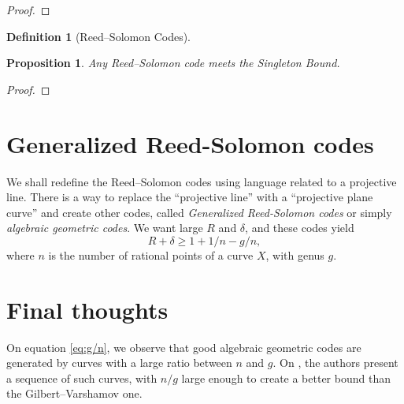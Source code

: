 \documentclass[11pt, letterpaper]{amsart}
\newtheorem{prop}[thm]{Proposition}
\theoremstyle{definition}
\newtheorem{defn}[]{Definition}
\begin{document}
\begin{proof}

\end{proof}

\begin{defn}[Reed--Solomon Codes]

\end{defn}
\begin{prop}
Any Reed--Solomon code meets the Singleton Bound.
\end{prop}
\begin{proof}

\end{proof}

\section{Generalized Reed-Solomon codes} \label{s:grs}
We shall redefine the Reed--Solomon codes using language related to a projective line. There is a way to replace the ``projective line'' with a ``projective plane curve'' and create other codes, called \emph{Generalized Reed-Solomon codes} or simply \emph{algebraic geometric codes}. We want large $R$ and $\delta$, and these codes yield \begin{equation}\label{eq:g/n} R + \delta \ge 1 + 1/n - g/n,\end{equation} where $n$ is the number of rational points of a curve $X$, with genus $g$.

\section{Final thoughts} \label{s:tvz} On equation \eqref{eq:g/n}, we observe that good algebraic geometric codes are generated by curves with a large ratio between $n$ and $g$. On \cite{TVZ82}, the authors present a sequence of such curves, with $n/g$ large enough to create a better bound than the Gilbert--Varshamov one.
\end{document}
